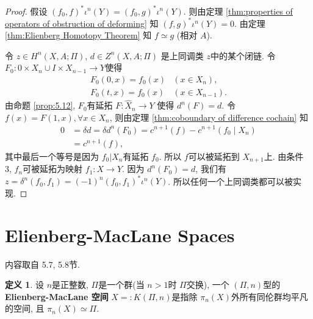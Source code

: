 \documentclass{ctexart}
\theoremstyle{plain}
\theoremstyle{definition}
\newtheorem{definition}[theorem]{定义}
\renewcommand{\emph}{\textbf}
\begin{document}
            \begin{proof}
                假设 $(f_0,f)^{*}\iota^{n}(Y)=(f_0,g)^{*}\iota^{n}(Y)$. 则由定理 \ref{thm:properties of operators of obstruction of deforming} 知 $(f,g)^{*}\iota^{n}(Y)=0$. 由定理 \ref{thm:Elienberg Homotopy Theorem} 知 $f\simeq g$ (相对 $A$).

                令 $z \in H^{n}(X,A;\Pi)$, $d \in Z^{n}(X,A;\Pi)$ 是上同调类 $z$中的某个闭链. 令 $F_0:0\times X_{n}\cup I\times X_{n-1}\to Y$使得 
                \begin{equation*}
                    \begin{array}{ll}
                        F_0(0, x)=f_0(x) & \left(x \in X_n\right), \\
                        F_0(t, x)=f_0(x) & \left(x \in X_{n-1}\right) .
                    \end{array}
                \end{equation*}
                由命题 \ref{prop:5.12}, $F_0$有延拓 $F:\hat{X}_{n}\to Y$ 使得 $d^{n}(F)=d$. 令 $f(x)=F(1,x), \forall x \in X_{n}$, 则由定理 \ref{thm:coboundary of difference cochain} 知
                \begin{equation*}
                    \begin{aligned}
                        0 & =\delta d=\delta d^n\left(F_0\right)=c^{n+1}(f)-c^{n+1}\left(f_0 \mid X_n\right) \\
                        & =c^{n+1}(f),
                    \end{aligned}
                \end{equation*}
                其中最后一个等号是因为 $f_0|X_{n}$有延拓 $f_0$. 所以 $f$可以被延拓到 $X_{n+1}$上. 由条件 3, $f_{n}$可被延拓为映射 $f_1:X\to Y$. 因为 $d^{n}(F_0)=d$, 我们有 $z=\delta^{n}(f_0,f_1)=(-1)^{n}(f_0,f_1)^{*}\iota^{n}(Y)$. 所以任何一个上同调类都可以被实现.
            \end{proof}


            
        


    \section{Elienberg-MacLane Spaces}
        内容取自\cite{Whitehead1978} 5.7, 5.8节.

        \begin{definition}
            设 $n$是正整数, $\Pi$是一个群(当 $n>1$时 $\Pi$交换), 一个 $(\Pi,n)$型的 \emph{Elienberg-MacLane 空间} $X=:K(\Pi,n)$是指除 $\pi_{n}(X)$外所有同伦群均平凡的空间, 且 $\pi_{n}(X)\simeq \Pi$.
        \end{definition}
\end{document}
